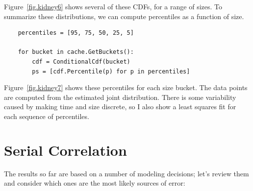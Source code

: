 \documentclass[12pt]{book}
\begin{document}
Figure~\ref{fig.kidney6} shows several of these CDFs, for
a range of sizes.  To summarize these distributions, we can
compute percentiles as a function of size.

\begin{verbatim}
    percentiles = [95, 75, 50, 25, 5]

    for bucket in cache.GetBuckets():
        cdf = ConditionalCdf(bucket)      
        ps = [cdf.Percentile(p) for p in percentiles]
\end{verbatim}

Figure~\ref{fig.kidney7} shows these percentiles for each
size bucket.  The data points are computed from the estimated
joint distribution.  There is some variability caused by making
time and size discrete, so I also show a least squares fit for
each sequence of percentiles.


%


\section{Serial Correlation}
\label{serial}

The results so far are based on a number of modeling decisions;
let's review them and consider which ones are the most
likely sources of error:
\end{document}

